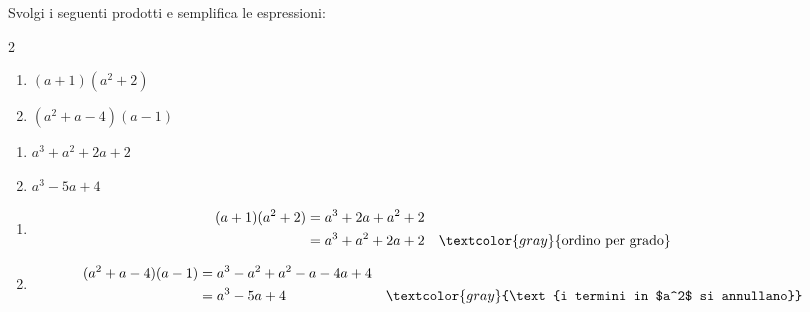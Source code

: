 \begin{question}[ID=1.6, subtitle={Prodotti di polinomi — variante}, tags={prodotti, polinomi}, difficulty=difficile]
Svolgi i seguenti prodotti e semplifica le espressioni:
\begin{center}\begin{minipage}{0.92\linewidth}
\begin{multicols}{2}
\begin{enumerate}[leftmargin=3.2cm]
\item $(a+1)(a^2+2)$
\item $(a^2 + a - 4)(a - 1)$
\end{enumerate}
\end{multicols}
\end{minipage}\end{center}
\begin{solution}
\begin{enumerate}
    \item $a^3+a^2+2a+2$
    \item $a^3-5a+4$
\end{enumerate}
\end{solution}
\begin{explanation}
\begin{enumerate}
    \item \[\begin{aligned}
    (a+1)(a^2+2) &= a^3+2a+a^2+2\\
    &= a^3+a^2+2a+2 && \textcolor{gray}{\text{ordino per grado}}
    \end{aligned}\]
    \item \[\begin{aligned}
    (a^2+a-4)(a-1) &= a^3-a^2+a^2-a-4a+4\\
    &= a^3-5a+4 && \textcolor{gray}{\text{i termini in $a^2$ si annullano}}
    \end{aligned}\]
\end{enumerate}
\end{explanation}
\end{question}

